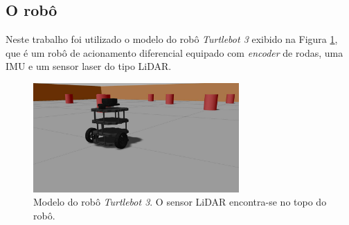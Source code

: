 \subsection{O robô}
Neste trabalho foi utilizado o modelo do robô \emph{Turtlebot 3} \cite{TurtleBot_3} exibido na Figura \ref{fig:turtlebot-digital-twin}, que é um robô de acionamento diferencial equipado com 
\textit{encoder} de rodas, uma IMU e um sensor laser do tipo LiDAR.
\begin{figure}[h]
  \centering
  \includegraphics[width=0.7\textwidth]{figs/robot-closeup.jpg}
  \caption[Modelo do robô \textit{Turtlebot 3}]{Modelo do robô \textit{Turtlebot 3}. O sensor LiDAR encontra-se no topo do robô.}
  \label{fig:turtlebot-digital-twin}
\end{figure}

